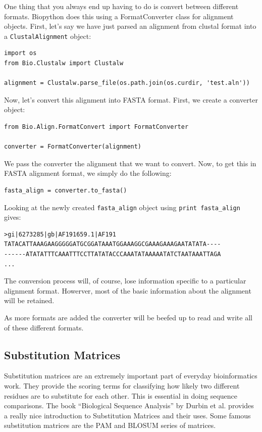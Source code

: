\documentclass{article}
\begin{document}
One thing that you always end up having to do is convert between different formats. Biopython does this using a FormatConverter class for alignment objects. First, let's say we have just parsed an alignment from clustal format into a \verb|ClustalAlignment| object:

\begin{verbatim}
import os
from Bio.Clustalw import Clustalw

alignment = Clustalw.parse_file(os.path.join(os.curdir, 'test.aln'))
\end{verbatim}

Now, let's convert this alignment into FASTA format. First, we create a converter object:

\begin{verbatim}
from Bio.Align.FormatConvert import FormatConverter

converter = FormatConverter(alignment)
\end{verbatim}

We pass the converter the alignment that we want to convert. Now, to get this in FASTA alignment format, we simply do the following:

\begin{verbatim}
fasta_align = converter.to_fasta()
\end{verbatim}

Looking at the newly created \verb|fasta_align| object using \verb|print fasta_align| gives:

\begin{verbatim}
>gi|6273285|gb|AF191659.1|AF191
TATACATTAAAGAAGGGGGATGCGGATAAATGGAAAGGCGAAAGAAAGAATATATA----
------ATATATTTCAAATTTCCTTATATACCCAAATATAAAAATATCTAATAAATTAGA
...
\end{verbatim}

The conversion process will, of course, lose information specific to a particular alignment format. Howerver, most of the basic information about the alignment will be retained.


As more formats are added the converter will be beefed up to read and write all of these different formats.

\subsection{Substitution Matrices}
\label{sec:sub_matrix}

Substitution matrices are an extremely important part of everyday bioinformatics work. They provide the scoring terms for classifying how likely two different residues are to substitute for each other. This is essential in doing sequence comparisons. The book ``Biological Sequence Analysis'' by Durbin et al. provides a really nice introduction to Substitution Matrices and their uses. Some famous substitution matrices are the PAM and BLOSUM series of matrices.
\end{document}
